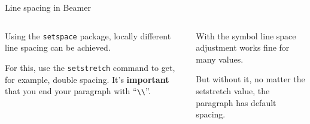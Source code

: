 \documentclass{beamer}
\begin{document}
\begin{frame}{Line spacing in Beamer}
  \begin{columns}
    \begin{column}{.45\textwidth}

      Using the \texttt{setspace} package, locally 
      different line spacing can be achieved.

      \vspace{0.7cm}

      { For this, use the \texttt{setstretch}
        command to get, for example, double spacing. It's 
        \textbf{important} that you end your paragraph with
        ``\texttt{\textbackslash\textbackslash}''.\\}

    \end{column}
    \begin{column}{.45\textwidth}

      { With the symbol line space adjustment 
       works fine for many values.\\}

      \vspace{1.3cm}

      { But without it, no matter the 
       setstretch value, the paragraph has default spacing.}

      \vspace{1.6cm}

    \end{column}
  \end{columns}
\end{frame}
\end{document}
